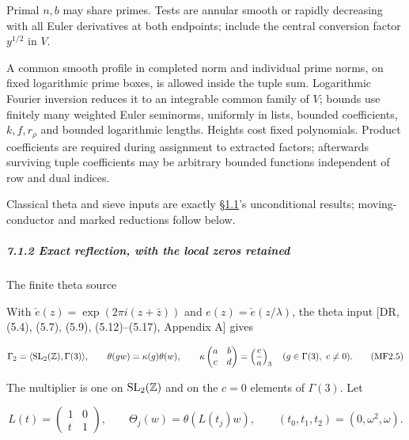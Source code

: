 Primal \(n,b\) may share primes. Tests are annular smooth or rapidly decreasing with all Euler derivatives at both endpoints; include the central conversion factor \(y^{1/2}\) in \(V\).

A common smooth profile in completed norm and individual prime norms, on fixed logarithmic prime boxes, is allowed inside the tuple sum. Logarithmic Fourier inversion reduces it to an integrable common family of \(V\); bounds use finitely many weighted Euler seminorms, uniformly in lists, bounded coefficients, \(k,f,r_\rho\) and bounded logarithmic lengths. Heights cost fixed polynomials. Product coefficients are required during assignment to extracted factors; afterwards surviving tuple coefficients may be arbitrary bounded functions independent of row and dual indices.

Classical theta and sieve inputs are exactly §\protect\hyperlink{cf:classical-inputs}{1.1}'s unconditional results; moving-conductor and marked reductions follow below.

\hypertarget{exact-reflection-with-the-local-zeros-retained}{}

\label{exact-reflection-with-the-local-zeros-retained}

\hypertarget{exact-reflection-with-the-local-zeros-retained-heading-2}{%
\subparagraph{7.1.2 Exact reflection, with the local zeros retained}}

\hypertarget{the-finite-theta-source}{}

\label{the-finite-theta-source}

The finite theta source

With \(\check e(z)=\exp(2\pi i(z+\bar z))\) and \(e(z)=\check e(z/\lambda)\), the theta input {[}DR, (5.4), (5.7), (5.9), (5.12)--(5.17), Appendix A{]} gives

\hypertarget{mf:eq:B2.5}{}

\label{mf:eq:B2.5}

\[
\Gamma_2=\langle {\rm SL}_2(\mathbb Z),\Gamma(3)\rangle,\qquad
\theta(gw)=\kappa(g)\theta(w),\qquad
\kappa\begin{pmatrix}a&b\\c&d\end{pmatrix}
=\left(\frac ca\right)_3\quad(g\in\Gamma(3),\ c\ne0).
\qquad\text{(MF2.5)}
\]

The multiplier is one on \({\rm SL}_2(\mathbb Z)\) and on the \(c=0\) elements of \(\Gamma(3)\). Let

\[
L(t)=\begin{pmatrix}1&0\\t&1\end{pmatrix},\qquad
\Theta_j(w)=\theta(L(t_j)w),\qquad
(t_0,t_1,t_2)=(0,\omega^2,\omega).
\]

